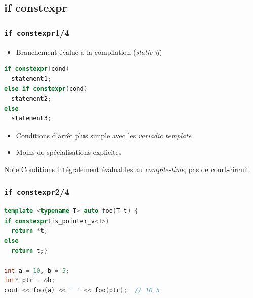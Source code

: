 \documentclass[C++.tex]{subfiles}
\begin{document}
\subsection*{if constexpr}
\begin{frame}[fragile]
	\frametitle{\lstinline|if constexpr|\titlehfill{}1/4}
	\begin{itemize}
		\item Branchement évalué à la compilation (\textit{static-if})
	\end{itemize}

	\begin{lstlisting}[language=C++]
if constexpr(cond)
  statement1;
else if constexpr(cond)
  statement2;
else
  statement3;\end{lstlisting}

	\begin{itemize}
		\item Conditions d'arrêt plus simple avec les \textit{variadic template}
		\item Moins de spécialisations explicites

	\end{itemize}

	\begin{block}{Note}
		Conditions intégralement évaluables au \textit{compile-time}, pas de court-circuit

	\end{block}
\end{frame}

\begin{frame}[fragile]
	\frametitle{\lstinline|if constexpr|\titlehfill{}2/4}
	\begin{lstlisting}[language=C++]
template <typename T> auto foo(T t) {
if constexpr(is_pointer_v<T>)
  return *t;
else
  return t;}

int a = 10, b = 5;
int* ptr = &b;
cout << foo(a) << ' ' << foo(ptr);  // 10 5\end{lstlisting}
\end{frame}
\end{document}

